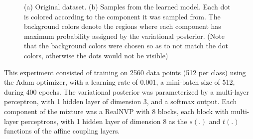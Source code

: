 \begin{figure}[!htb]
  \begin{subfigmatrix}{2}
  \end{subfigmatrix}
    \caption{(a) Original dataset. (b) Samples from the learned model. Each
dot is colored according to the component it was sampled from. The background
colors denote the regions where each component has maximum probability assigned
by the variational posterior. (Note that the background colors were chosen
so as to not match the dot colors, otherwise the dots would not be visible)}
  \label{fig:pinwheel}
\end{figure}

This experiment consisted of training on 2560 data points (512 per class) using
the Adam optimizer, with a learning rate of 0.001, a
mini-batch size of 512, during 400 epochs. The variational posterior was parameterized
by a multi-layer perceptron, with 1 hidden layer of dimension 3, and a
softmax output. Each component of the mixture was a RealNVP with 8 blocks, each
block with multi-layer perceptrons, with 1 hidden layer of dimension 8 as the
$s(.)$ and $t(.)$ functions of the affine coupling layers.

